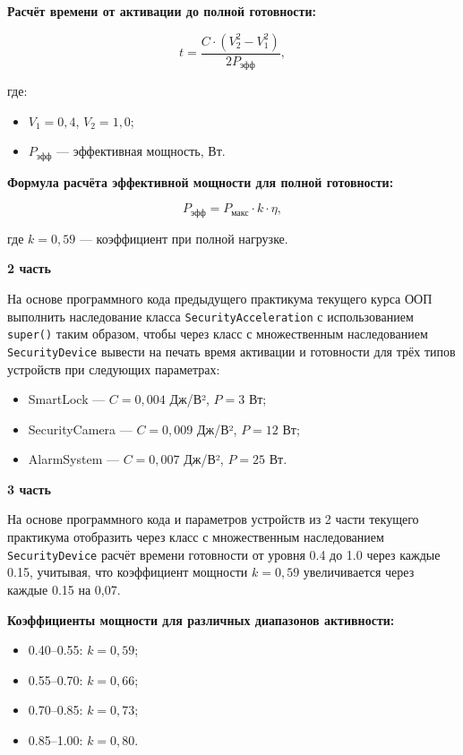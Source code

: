 \begin{enumerate}
\textbf{Расчёт времени от активации до полной готовности:}

\begin{equation}
t = \frac{C \cdot (V_2^2 - V_1^2)}{2P_{\text{эфф}}},
\end{equation}

где:  
\begin{itemize}
    \item $V_1 = 0{,}4$, $V_2 = 1{,}0$;  
    \item $P_{\text{эфф}}$ — эффективная мощность, Вт.  
\end{itemize}

\textbf{Формула расчёта эффективной мощности для полной готовности:}

\begin{equation}
P_{\text{эфф}} = P_{\text{макс}} \cdot k \cdot \eta,
\end{equation}

где $k = 0{,}59$ — коэффициент при полной нагрузке.

\textbf{2 часть}

На основе программного кода предыдущего практикума текущего курса ООП выполнить наследование класса \texttt{SecurityAcceleration} с использованием \texttt{super()} таким образом, чтобы через класс с множественным наследованием \texttt{SecurityDevice} вывести на печать время активации и готовности для трёх типов устройств при следующих параметрах:

\begin{itemize}
    \item SmartLock — $C = 0{,}004$ Дж/В², $P = 3$ Вт;  
    \item SecurityCamera — $C = 0{,}009$ Дж/В², $P = 12$ Вт;  
    \item AlarmSystem — $C = 0{,}007$ Дж/В², $P = 25$ Вт.  
\end{itemize}

\textbf{3 часть}

На основе программного кода и параметров устройств из 2 части текущего практикума отобразить через класс с множественным наследованием \texttt{SecurityDevice} расчёт времени готовности от уровня 0.4 до 1.0 через каждые 0.15, учитывая, что коэффициент мощности $k = 0{,}59$ увеличивается через каждые 0.15 на 0{,}07.

\textbf{Коэффициенты мощности для различных диапазонов активности:}
\begin{itemize}
    \item 0.40–0.55: $k = 0{,}59$;  
    \item 0.55–0.70: $k = 0{,}66$;  
    \item 0.70–0.85: $k = 0{,}73$;  
    \item 0.85–1.00: $k = 0{,}80$.  
\end{itemize}



\end{enumerate}
